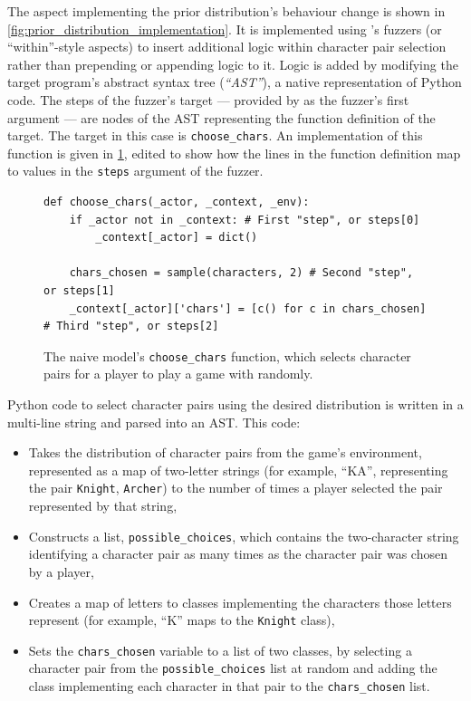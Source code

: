 The aspect implementing the prior distribution's behaviour change is shown in
\cref{fig:prior_distribution_implementation}. It is implemented using \pdsfthree{}'s
fuzzers (or ``within''-style aspects) to insert additional logic within
character pair selection rather than prepending or appending logic to it. Logic
is added by modifying the target program's abstract syntax tree (\emph{``AST''}),
a native representation of Python code. The steps of the fuzzer's target ---
provided by \pdsfthree{} as the fuzzer's first argument --- are nodes of the AST
representing the function definition of the target. The target in this case is
\lstinline{choose_chars}. An implementation of this function is given in
\cref{fig:choose_chars_implementation_annotated_with_steps}, edited to show how
the lines in the function definition map to values in the \lstinline{steps}
argument of the fuzzer.

\begin{figure}
  \begin{lstlisting}[style=footnotesize_python]
def choose_chars(_actor, _context, _env):
    if _actor not in _context: # First "step", or steps[0]
        _context[_actor] = dict()

    chars_chosen = sample(characters, 2) # Second "step", or steps[1]
    _context[_actor]['chars'] = [c() for c in chars_chosen] # Third "step", or steps[2]
  \end{lstlisting}
  \caption{The naive model's \lstinline{choose_chars} function, which selects
  character pairs for a player to play a game with randomly.}
  \label{fig:choose_chars_implementation_annotated_with_steps}
\end{figure}

Python code to select character pairs using the desired distribution is written
in a multi-line string and parsed into an AST. This code:

\begin{itemize}
\item Takes the distribution of character pairs from the game's environment,
represented as a map of two-letter strings (for example, ``KA'', representing
the pair \lstinline{Knight}, \lstinline{Archer}) to the number of times a player
selected the pair represented by that string,
\item Constructs a list, \lstinline{possible_choices}, which contains the
two-character string identifying a character pair as many times as the character
pair was chosen by a player,
\item Creates a map of letters to classes implementing the characters those
letters represent (for example, ``K'' maps to the \lstinline{Knight} class),
\item Sets the \lstinline{chars_chosen} variable to a list of two classes, by
selecting a character pair from the \lstinline{possible_choices} list at random
and adding the class implementing each character in that pair to the
\lstinline{chars_chosen} list.
\end{itemize}


